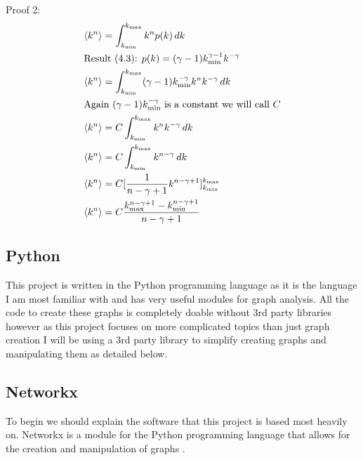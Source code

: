 \documentclass{article}
\begin{document}
            Proof 2:
            \begin{align*}
                &\langle k^n \rangle = \int_{k_{\text{min}}}^{k_{\text{max}}}k^{n}p(k) \,dk\\
                &\text{Result (4.3): } p(k) = (\gamma -1)k^{\gamma-1}_{\text{min}}k^{-\gamma}\\
                &\langle k^n \rangle = \int_{k_{\text{min}}}^{k_{\text{max}}} (\gamma-1)k^{-\gamma}_{\text{min}}k^{n}k^{-\gamma} \,dk \\
                &\text{Again $ (\gamma-1)k^{-\gamma}_{\text{min}}$ is a constant we will call $C$}\\
                &\langle k^n \rangle = C\int_{k_{\text{min}}}^{k_{\text{max}}}k^{n}k^{-\gamma} \,dk\\ 
                &\langle k^n \rangle = C\int_{k_{\text{min}}}^{k_{\text{max}}}k^{n-\gamma} \,dk\\
                &\langle k^n \rangle = C[\frac{1}{n-\gamma +1}k^{n-\gamma+1}]^{k_{\text{max}}}_{k_{\text{min}}}\\
                &\langle k^n \rangle = C\frac{k_{\text{max}}^{n-\gamma+1} -k_{\text{min}}^{n-\gamma+1}}{n-\gamma +1 }
            \end{align*}

        \subsection{Python}
        This project is written in the Python programming language as it is the language I am most familiar with and has very useful modules for graph analysis. All the code to create these graphs is completely doable without 3rd party libraries however as this project focuses on more complicated topics than just graph creation I will be using a 3rd party library to simplify creating graphs and manipulating them as detailed below.
        \subsection{Networkx}
        To begin we should explain the software that this project is based most heavily on. Networkx is a module for the Python programming language that allows for the creation and manipulation of graphs \parencite{SciPyProceedings_11}.
\end{document}
